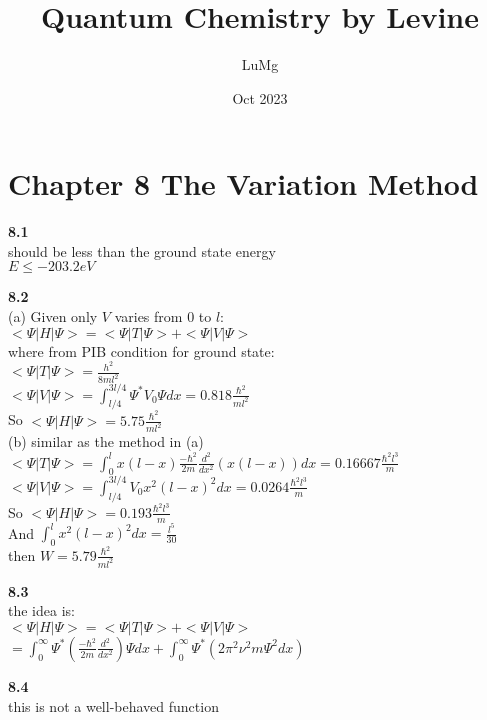 \documentclass{article}
\title{Quantum Chemistry by Levine}
\author{LuMg}
\date{Oct 2023}
\begin{document}
\maketitle

\section{Chapter 8 The Variation Method}
\textbf{8.1}\\
should be less than the ground state energy\\
$E \leq -203.2eV$\\
\newline

\textbf{8.2}\\
(a) Given only $V$ varies from $0$ to $l$:\\
$<\Psi|H|\Psi> = <\Psi|T|\Psi>+<\Psi|V|\Psi>$\\
where from PIB condition for ground state:\\
$<\Psi|T|\Psi> = \frac{h^2}{8ml^2}$\\
$<\Psi|V|\Psi> = \int_{l/4}^{3l/4}\Psi^*V_0\Psi dx = 0.818\frac{\hbar^2}{ml^2}$\\
So $<\Psi|H|\Psi> = 5.75\frac{\hbar^2}{ml^2}$\\
\newline
(b) similar as the method in (a)\\
$<\Psi|T|\Psi> = \int_0^l x(l-x)\frac{-\hbar^2}{2m}\frac{d^2}{dx^2}(x(l-x))dx = 0.16667\frac{\hbar^2l^3}{m}$\\
$<\Psi|V|\Psi> = \int_{l/4}^{3l/4}V_0x^2(l-x)^2dx = 0.0264\frac{\hbar^2l^3}{m}$\\
So $<\Psi|H|\Psi> = 0.193\frac{\hbar^2l^3}{m}$\\
And $\int_0^lx^2(l-x)^2dx = \frac{l^5}{30}$\\
then $W = 5.79\frac{\hbar^2}{ml^2}$\\
\newline

\textbf{8.3}\\
the idea is:\\
$<\Psi|H|\Psi> = <\Psi|T|\Psi>+<\Psi|V|\Psi>$\\
$= \int_0^{\infty}\Psi^*(\frac{-\hbar^2}{2m}\frac{d^2}{dx^2})\Psi dx +\int_0^{\infty}\Psi^*(2\pi^2 \nu^2m \Psi^2dx)$\\
\newline

\textbf{8.4}\\
this is not a well-behaved function\\
\newline
\end{document}
